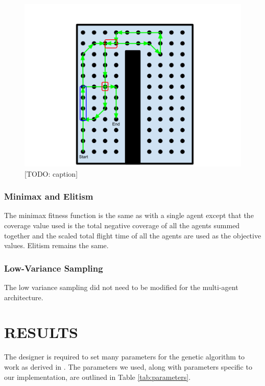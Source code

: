 \documentclass[letterpaper, 10 pt, conference]{ieeeconf}  %
\newcommand{\todo}[1]{{\color{blue}[TODO: #1]}}
\begin{document}
\begin{figure}
\centering
\includegraphics[width=0.8\linewidth]{figures/loop_closure.png}
\caption{\todo{caption}%
}
\label{fig:loop_closure}
\end{figure}


\subsubsection{Minimax and Elitism}
The minimax fitness function is the same as with a single agent except that the coverage value used is the total negative coverage of all the agents summed together and the scaled total flight time of all the agents are used as the objective values. Elitism remains the same.

\subsubsection{Low-Variance Sampling}
The low variance sampling did not need to be modified for the multi-agent architecture.

\section{RESULTS}\label{results}

The designer is required to set many parameters for the genetic algorithm to work as derived in \cite{Parkinson2019}. The parameters we used, along with parameters specific to our implementation, are outlined in Table \ref{tab:parameters}.
\end{document}
